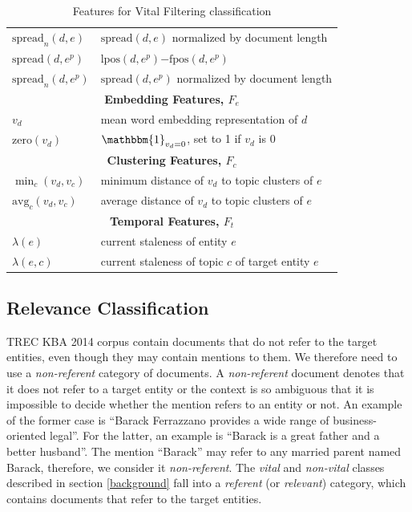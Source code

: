 \documentclass{article}
\begin{document}
\begin{table}[tb]
{\begin{tabular}{p{}p{}}
$\text{spread}_n(d,e)$ & $\text{spread}(d,e)$ normalized by document length \\
$\text{spread}(d,e^p)$ & $\text{lpos}(d,e^p)\mathord{-}\text{fpos}(d,e^p)$ \\
$\text{spread}_n(d,e^p)$ & $\text{spread}(d,e^p)$ normalized by document length \\ 
\midrule
\multicolumn{2}{c}{\textbf{Embedding Features, $F_e$}} \\ %
\midrule
  $v_d$ & mean word embedding representation of $d$ \\
  $\text{zero}(v_d)$& $\mathbbm{1}_{v_d=0}$, set to 1 if $v_d$ is $0$ \\
\midrule
\multicolumn{2}{c}{\textbf{Clustering Features, $F_c$}} \\ %
\midrule
  $\min_c(v_d,v_c)$& minimum distance of $v_d$ to topic clusters of $e$ \\
  $\text{avg}_c(v_d,v_c)$& average distance of $v_d$ to topic clusters of $e$ \\
\midrule
\multicolumn{2}{c}{\textbf{Temporal Features, $F_t$}} \\ %
\midrule
  $\lambda(e)$& current staleness of entity $e$ \\
  $\lambda(e,c)$& current staleness of topic $c$ of target entity $e$ \\
\bottomrule
\end{tabular}
} %
\caption{Features for Vital Filtering classification}
\label{features}
\end{table}


\subsection{Relevance Classification}

TREC KBA 2014 corpus contain documents that do not refer to the target entities, even though they may contain mentions to them. We therefore need to use a \emph{non-referent} category of documents. 
%
A \emph{non-referent} document denotes that it does not refer to a target entity or the context is so ambiguous that it is impossible to decide whether the mention refers to an entity or not. An example of the former case is ``Barack Ferrazzano provides a wide range of business-oriented legal''. For the latter, an example is ``Barack is a great father and a better husband''. The mention ``Barack'' may refer to any married parent named Barack, therefore, we consider it \emph{non-referent}.
%
The \emph{vital} and \emph{non-vital} classes described in section \ref{background} fall into a \emph{referent} (or \emph{relevant}) category, which contains documents that refer to the target entities.
\end{document}
